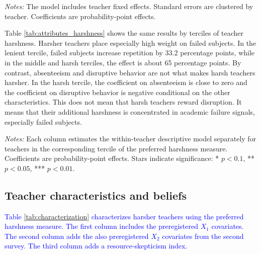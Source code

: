 \documentclass[12pt,a4paper]{article}
\newcommand{\tabpath}{../3. Output/tables/}
\newcommand{\pp}{percentage points}
\begin{document}
\begin{table}[H]
	\centering
	\caption{Descriptive within-teacher weights of student characteristics}
	\label{tab:attributes}
	
	\begin{minipage}{0.92\textwidth}
		\footnotesize \textit{Notes:} The model includes teacher fixed effects. Standard errors are clustered by teacher. Coefficients are probability-point effects.
	\end{minipage}
\end{table}


Table \ref{tab:attributes_harshness} shows the same results by terciles of teacher harshness. Harsher teachers place especially high weight on failed subjects. In the lenient tercile, failed subjects increase repetition by 33.2 \pp, while in the middle and harsh terciles, the effect is about 65 \pp. By contrast, absenteeism and disruptive behavior are not what makes harsh teachers harsher. In the harsh tercile, the coefficient on absenteeism is close to zero and the coefficient on disruptive behavior is negative conditional on the other characteristics. This does not mean that harsh teachers reward disruption. It means that their additional harshness is concentrated in academic failure signals, especially failed subjects.

\begin{table}[H]
	\centering
	\caption{Student-characteristic weights by teacher harshness tercile}
	\label{tab:attributes_harshness}
	
	\begin{minipage}{0.92\textwidth}
		\footnotesize \textit{Notes:} Each column estimates the within-teacher descriptive model separately for teachers in the corresponding tercile of the preferred harshness measure. Coefficients are probability-point effects. Stars indicate significance: * \(p<0.1\), ** \(p<0.05\), *** \(p<0.01\).
	\end{minipage}
\end{table}



\subsection{Teacher characteristics and beliefs}

\textcolor{blue}{Table \ref{tab:characterization} characterizes harsher teachers using the preferred harshness measure. The first column includes the preregistered \(X_1\) covariates. The second column adds the also preregistered \(X_2\) covariates from the second survey. The third column adds a resource-skepticism index.}
\end{document}
